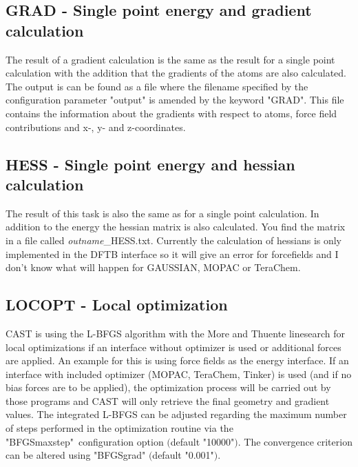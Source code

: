\documentclass[10pt,a4paper]{article} %
\newif\ifdevmode %
\begin{document}
	\subsection{GRAD - Single point energy and gradient calculation}
	The result of a gradient calculation is the same as the result for a single point calculation with the addition that the gradients of the atoms are also calculated. The output is can be found as a file where the filename specified by the configuration parameter "output" is amended by the keyword "GRAD". This file contains the information about the gradients with respect to atoms, force field contributions and x-, y- and z-coordinates.
	
	\subsection{HESS - Single point energy and hessian calculation}
	The result of this task is also the same as for a single point calculation. In addition to the energy the hessian matrix is also calculated. You find the matrix in a file called \textit{outname}\_HESS.txt. Currently the calculation of hessians is only implemented in the DFTB interface so it will give an error for forcefields and I don't know what will happen for GAUSSIAN, MOPAC or TeraChem.
	

	\subsection{LOCOPT - Local optimization}
	\label{sec:locopt}
	\ac{CAST} is using the L-BFGS algorithm\supercite{bfgs} with the More and Thuente linesearch\supercite{morethuente} for local optimizations if an interface without optimizer is used or additional forces are applied. An example for this is using force fields as the energy interface. \ifdevmode ~\\ \colorbox{red}{what does additional forces applied mean?} ~\\ \fi
	If an interface with included optimizer (MOPAC, TeraChem, Tinker) is used (and if no bias forces are to be applied), the optimization process will be carried out by those programs and \ac{CAST} will only retrieve the final geometry and gradient values.
	The integrated L-BFGS can be adjusted regarding the maximum number of steps performed in the optimization routine via the "BFGSmaxstep"\ configuration option $($default "10000"$)$.
	The convergence criterion can be altered using "BFGSgrad" $($default "0.001"$)$.
\end{document}
